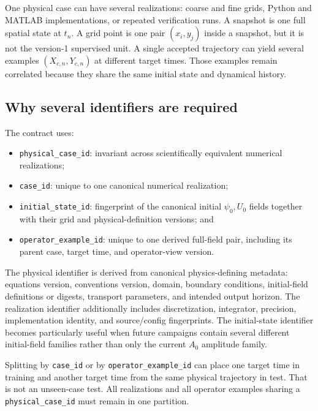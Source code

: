 \documentclass[11pt]{article}
\newcommand{\code}[1]{\texttt{#1}}
\begin{document}
One physical case can have several realizations: coarse and fine grids, Python and MATLAB implementations, or repeated verification runs. A snapshot is one full spatial state at $t_n$. A grid point is one pair $(x_i,y_j)$ inside a snapshot, but it is not the version-1 supervised unit. A single accepted trajectory can yield several examples $(X_{c,n},Y_{c,n})$ at different target times. Those examples remain correlated because they share the same initial state and dynamical history.

\subsection{Why several identifiers are required}

The contract uses:
\begin{itemize}
  \item \code{physical\_case\_id}: invariant across scientifically equivalent numerical realizations;
  \item \code{case\_id}: unique to one canonical numerical realization;
  \item \code{initial\_state\_id}: fingerprint of the canonical initial $\psi_0,U_0$ fields together with their grid and physical-definition versions; and
  \item \code{operator\_example\_id}: unique to one derived full-field pair, including its parent case, target time, and operator-view version.
\end{itemize}

The physical identifier is derived from canonical physics-defining metadata: equations version, conventions version, domain, boundary conditions, initial-field definitions or digests, transport parameters, and intended output horizon. The realization identifier additionally includes discretization, integrator, precision, implementation identity, and source/config fingerprints. The initial-state identifier becomes particularly useful when future campaigns contain several different initial-field families rather than only the current $A_0$ amplitude family.

\begin{warningbox}
Splitting by \code{case\_id} or by \code{operator\_example\_id} can place one target time in training and another target time from the same physical trajectory in test. That is not an unseen-case test. All realizations and all operator examples sharing a \code{physical\_case\_id} must remain in one partition.
\end{warningbox}
\end{document}
